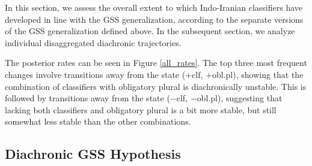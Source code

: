 \documentclass[11pt]{article}
\begin{document}
{\color{pink} In this section, we assess the overall extent to which Indo-Iranian classifiers have developed in line with the GSS generalization, according to the separate versions of the GSS generalization defined above. 
In the subsequent section, we analyze individual disaggregated diachronic trajectories. 
}

{\color{blue} The posterior rates can be seen in Figure \ref{all_rates}. The top three most frequent changes involve transitions away from the state {\sc ($+$clf, $+$obl.pl)}, showing that the combination of classifiers with obligatory plural is diachronically unstable.
This is followed by transitions away from the state {\sc ($-$clf, $-$obl.pl)}, suggesting that lacking both classifiers and obligatory plural is a bit more stable, but still somewhat less stable than the other combinations.}

\subsection{Diachronic GSS Hypothesis}
\end{document}
